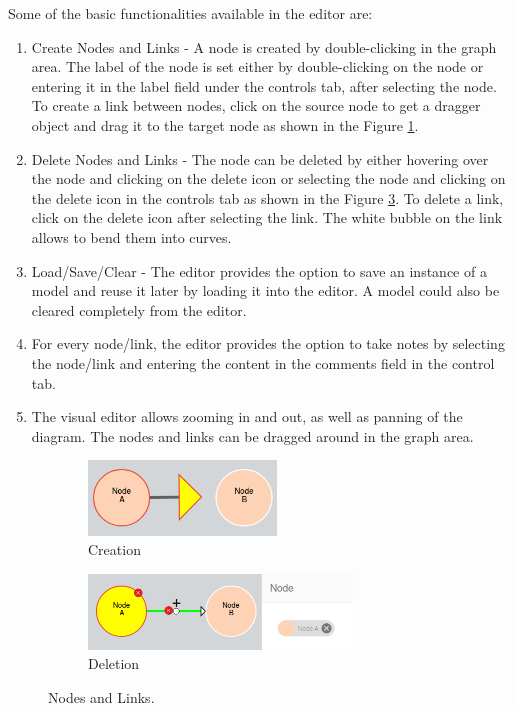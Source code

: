 \documentclass[a4paper]{article}
\begin{document}
Some of the basic functionalities available in the editor are:
\begin{enumerate}
	\item Create Nodes and Links - A node is created by double-clicking in the graph area. The label of the node is set either by double-clicking on the node or entering it in the label field under the controls tab, after selecting the node. To create a link between nodes, click on the source node to get a dragger object and drag it to the target node as shown in the Figure \ref{fig:node_link}.
		
	\item Delete Nodes and Links - The node can be deleted by either hovering over the node and clicking on the delete icon or selecting the node and clicking on the delete icon in the controls tab as shown in the Figure \ref{fig:delete}. To delete a link, click on the delete icon after selecting the link. The white bubble on the link allows to bend them into curves.
	
	\item Load/Save/Clear - The editor provides the option to save an instance of a model and reuse it later by loading it into the editor. A model could also be cleared completely from the editor.

	\item For every node/link, the editor provides the option to take notes by selecting the node/link and entering the content in the comments field in the control tab. 
	
	\item The visual editor allows zooming in and out, as well as panning of the diagram. The nodes and links can be dragged around in the graph area. 
	
\end{enumerate} 

\begin{figure}[h]
 
\begin{subfigure}{0.5\textwidth}
\includegraphics[width=0.8\linewidth, height=2cm]{img/node_link.png} 
\caption{Creation}
\label{fig:node_link}
\end{subfigure}
\begin{subfigure}{0.5\textwidth}
\includegraphics[width=1.2\linewidth, height=2cm]{img/delete_nodeLink.png}
\caption{Deletion}
\label{fig:delete}
\end{subfigure}
 
\caption{Nodes and Links.}
\end{figure}
\end{document}
